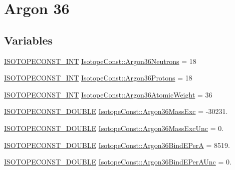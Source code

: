 \hypertarget{group___isotope_const-_argon-_ar36}{}\section{Argon 36}
\label{group___isotope_const-_argon-_ar36}
\subsection*{Variables}
\begin{DoxyCompactItemize}
\item 
\mbox{\hyperlink{group___isotope_const-_macros_ga5f18360b3e99483a35c32d789e62621c}{I\+S\+O\+T\+O\+P\+E\+C\+O\+N\+S\+T\+\_\+\+I\+NT}} \mbox{\hyperlink{group___isotope_const-_argon-_ar36_ga43db47d07feaedc03232cf3fe5a13651}{Isotope\+Const\+::\+Argon36\+Neutrons}} = 18
\item 
\mbox{\hyperlink{group___isotope_const-_macros_ga5f18360b3e99483a35c32d789e62621c}{I\+S\+O\+T\+O\+P\+E\+C\+O\+N\+S\+T\+\_\+\+I\+NT}} \mbox{\hyperlink{group___isotope_const-_argon-_ar36_ga147194de6a0468168bc5de10b9f4fbcc}{Isotope\+Const\+::\+Argon36\+Protons}} = 18
\item 
\mbox{\hyperlink{group___isotope_const-_macros_ga5f18360b3e99483a35c32d789e62621c}{I\+S\+O\+T\+O\+P\+E\+C\+O\+N\+S\+T\+\_\+\+I\+NT}} \mbox{\hyperlink{group___isotope_const-_argon-_ar36_gafb21b404ca4fbbb54a891366e16850b4}{Isotope\+Const\+::\+Argon36\+Atomic\+Weight}} = 36
\item 
\mbox{\hyperlink{group___isotope_const-_macros_ga8f45a7272ce02c0b4c65c44636ed719a}{I\+S\+O\+T\+O\+P\+E\+C\+O\+N\+S\+T\+\_\+\+D\+O\+U\+B\+LE}} \mbox{\hyperlink{group___isotope_const-_argon-_ar36_ga1bdb0a006e3549c3ad6e1743acdff3f3}{Isotope\+Const\+::\+Argon36\+Mass\+Exc}} = -\/30231.
\item 
\mbox{\hyperlink{group___isotope_const-_macros_ga8f45a7272ce02c0b4c65c44636ed719a}{I\+S\+O\+T\+O\+P\+E\+C\+O\+N\+S\+T\+\_\+\+D\+O\+U\+B\+LE}} \mbox{\hyperlink{group___isotope_const-_argon-_ar36_ga0593ae6e88506e098d9cd80747c4c5ba}{Isotope\+Const\+::\+Argon36\+Mass\+Exc\+Unc}} = 0.
\item 
\mbox{\hyperlink{group___isotope_const-_macros_ga8f45a7272ce02c0b4c65c44636ed719a}{I\+S\+O\+T\+O\+P\+E\+C\+O\+N\+S\+T\+\_\+\+D\+O\+U\+B\+LE}} \mbox{\hyperlink{group___isotope_const-_argon-_ar36_gad48f21987caec386974bd8498d182764}{Isotope\+Const\+::\+Argon36\+Bind\+E\+PerA}} = 8519.
\item 
\mbox{\hyperlink{group___isotope_const-_macros_ga8f45a7272ce02c0b4c65c44636ed719a}{I\+S\+O\+T\+O\+P\+E\+C\+O\+N\+S\+T\+\_\+\+D\+O\+U\+B\+LE}} \mbox{\hyperlink{group___isotope_const-_argon-_ar36_ga3714dc5a78a3513e8280c76d1b5eeecd}{Isotope\+Const\+::\+Argon36\+Bind\+E\+Per\+A\+Unc}} = 0.

\end{DoxyCompactItemize}
